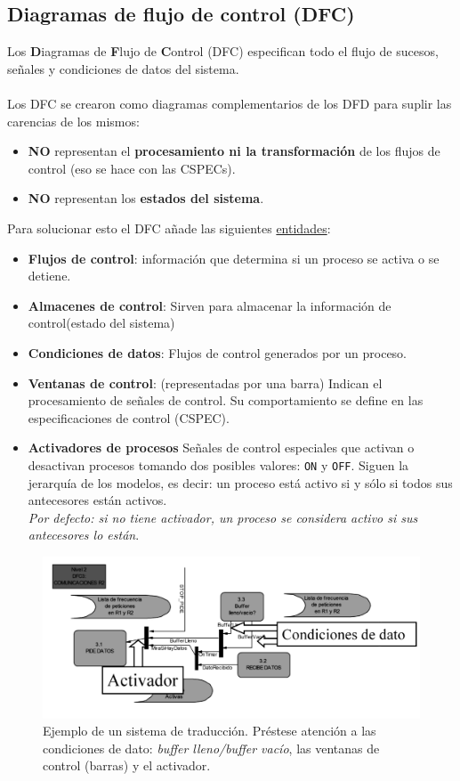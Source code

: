 \subsection{Diagramas de flujo de control (DFC)}
Los \textbf{D}iagramas de \textbf{F}lujo de \textbf{C}ontrol (DFC) especifican todo el flujo de sucesos, señales y condiciones de datos del sistema.
\\
\\
Los DFC se crearon como diagramas complementarios de los DFD para suplir las carencias de los mismos:
\begin{itemize}
    \item \textbf{NO} representan el \textbf{procesamiento ni la transformación} de los flujos de control (eso se hace con las CSPECs).
    \item \textbf{NO} representan los \textbf{estados del sistema}.
\end{itemize}
Para solucionar esto el DFC añade las siguientes \uline{entidades}:
\begin{itemize}
    \item \textbf{Flujos de control}: información que determina si un proceso se activa o se detiene.
    \item \textbf{Almacenes de control}: Sirven para almacenar la información de control(estado del sistema)
    \item \textbf{Condiciones de datos}: Flujos de control generados por un proceso.
    \item \textbf{Ventanas de control}: (representadas por una barra) Indican el procesamiento de señales de control. Su comportamiento se define en las especificaciones de control (CSPEC).
    \item \textbf{Activadores de procesos} Señales de control especiales que activan o desactivan procesos tomando dos posibles valores: \texttt{ON} y \texttt{OFF}. Siguen la jerarquía de los modelos, es decir: un proceso está activo si y sólo si todos sus antecesores están activos.
    \\
    \textit{Por defecto: si no tiene activador, un proceso se considera activo si sus antecesores lo están}.
\end{itemize}

\begin{figure}[H]
  \centering
  \includegraphics[width=0.9\linewidth]{Resources/ejemploDFC}
  \caption{Ejemplo de un sistema de traducción. Préstese atención a las condiciones de dato: \textit{buffer lleno/buffer vacío}, las ventanas de control (barras) y el activador.}
  \label{fig:ejemploCSPEC}
\end{figure}


